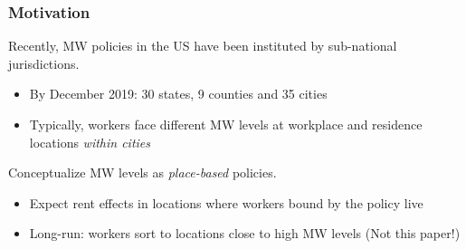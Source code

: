 \documentclass[aspectratio=169, t]{beamer}
\begin{document}
\begin{frame}
    \frametitle{Motivation}
    
    Recently, MW policies in the US have been instituted by sub-national jurisdictions.
    \begin{itemize}
        \item By December 2019: 30 states, 9 counties and 35 cities
        \item Typically, workers face different MW levels at workplace and residence locations \textit{within cities}
    \end{itemize}
    
    \vspace{2mm}
    Conceptualize MW levels as \textit{place-based} policies.
    \begin{itemize}
        \item Expect rent effects in locations where workers bound by the policy live
        \item Long-run: workers sort to locations close to high MW levels (Not this paper!)
    \end{itemize}
\end{frame}
\end{document}
